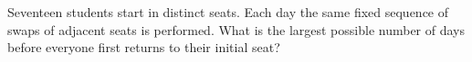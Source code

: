 Seventeen students start in distinct seats. Each day the same fixed sequence of swaps of adjacent seats is performed. What is the largest possible number of days before everyone first returns to their initial seat?
